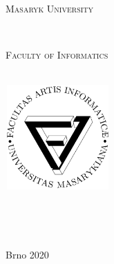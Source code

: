 \begin{titlepage}

  \vspace*{1.5cm}
  \makeatletter

  \begin{center}
    \begin{LARGE}
        \textsc{Masaryk University}
    \end{LARGE}\\
    \begin{Large}
        \textsc{Faculty of Informatics}
    \end{Large}\\[1cm]
    \includegraphics[width=4cm, height=4cm] {fi_logo.pdf}\\[2cm]
    \begin{Huge}
      \@title
    \end{Huge}\\[1.25cm]
    \begin{Large}
      \@subtitle
    \end{Large}\\[1.5cm]
    \begin{LARGE}
    \@author
    \end{LARGE}
    \vfill
    {\hfill\large Brno 2020}
  \end{center}
  \makeatother
\end{titlepage}

\newpage
\null
\thispagestyle{empty}
\newpage
